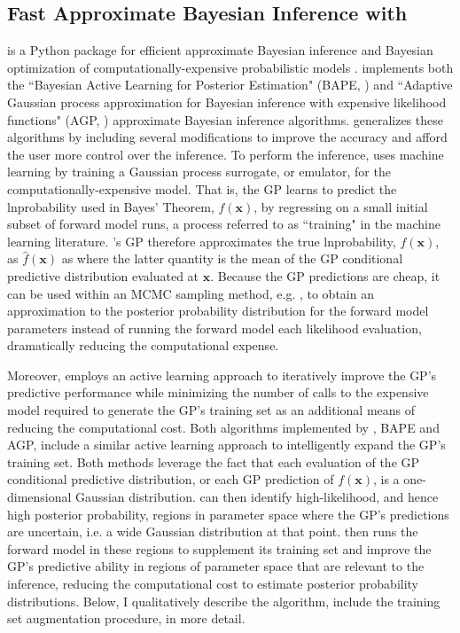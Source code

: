 \subsection{Fast Approximate Bayesian Inference with \approxposterior}

\approxposterior is a Python package for efficient approximate Bayesian inference and Bayesian optimization of computationally-expensive probabilistic models \citep{FlemingVanderPlas2018}. \approxposterior implements both the ``Bayesian Active Learning for Posterior Estimation" (BAPE, \citet{Kandasamy2017}) and ``Adaptive Gaussian process approximation for Bayesian inference with expensive likelihood functions" (AGP, \citet{Wang2018}) approximate Bayesian inference algorithms. \approxposterior generalizes these algorithms by including several modifications to improve the accuracy and afford the user more control over the inference. To perform the inference, \approxposterior uses machine learning by training a Gaussian process \citep[GP,][]{Rasmussen2006} surrogate, or emulator, for the computationally-expensive model. That is, the GP learns to predict the lnprobability used in Bayes' Theorem, $f(\textbf{x})$, by regressing on a small initial subset of forward model runs, a process referred to as ``training" in the machine learning literature. \approxposterior's GP therefore approximates the true lnprobability, $f(\textbf{x})$, as $\hat{f}(\textbf{x})$ as where the latter quantity is the mean of the GP conditional predictive distribution evaluated at $\textbf{x}$. Because the GP predictions are cheap, it can be used within an MCMC sampling method, e.g. \emcee, to obtain an approximation to the posterior probability distribution for the forward model parameters instead of running the forward model each likelihood evaluation, dramatically reducing the computational expense. 

Moreover, \approxposterior employs an active learning approach to iteratively improve the GP's predictive performance while minimizing the number of calls to the expensive model required to generate the GP's training set as an additional means of reducing the computational cost. Both algorithms implemented by \approxposterior, BAPE and AGP, include a similar active learning approach to intelligently expand the GP's training set. Both methods leverage the fact that each evaluation of the GP conditional predictive distribution, or each GP prediction of $f(\textbf{x})$, is a one-dimensional Gaussian distribution.  \approxposterior can then identify high-likelihood, and hence high posterior probability, regions in parameter space where the GP's predictions are uncertain, i.e. a wide Gaussian distribution at that point.  \approxposterior then runs the forward model in these regions to supplement its training set and improve the GP's predictive ability in regions of parameter space that are relevant to the inference, reducing the computational cost to estimate posterior probability distributions. Below, I qualitatively describe the \approxposterior algorithm, include the training set augmentation procedure, in more detail.

